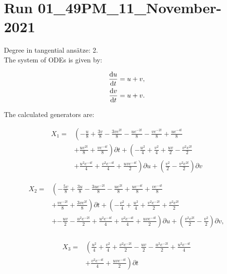 \section*{Run 01\_49PM\_11\_November-2021}
Degree in tangential ansätze:	2.\\
The system of ODEs is given by:

\begin{align*}
\dv{u}{t}&=u + v,\\
\dv{v}{t}&=u + v.\\
\end{align*}

\noindent The calculated generators are:

\begin{align*}
X_{1}=&\left(- \frac{u}{8}+\frac{3 v}{8}- \frac{3 v e^{2 t}}{8}- \frac{u e^{- 2 t}}{8}- \frac{v e^{- 2 t}}{8}+\frac{u e^{- 4 t}}{8}\right.\\
&+\left.\frac{u e^{2 t}}{8}+\frac{v e^{- 4 t}}{8} \right)\partial t+\left(- \frac{u^{2}}{4}+\frac{v^{2}}{4}+\frac{u v}{2}- \frac{v^{2} e^{2 t}}{2}\right.\\
&+\left.\frac{u^{2} e^{- 4 t}}{4}+\frac{v^{2} e^{- 4 t}}{4}+\frac{u v e^{- 4 t}}{2} \right)\partial u+\left(\frac{v^{2}}{2}- \frac{v^{2} e^{2 t}}{2} \right)\partial v
\end{align*}

\begin{align*}
X_{2}=&\left(- \frac{5 v}{8}+\frac{3 u}{8}- \frac{3 u e^{- 2 t}}{8}- \frac{u e^{2 t}}{8}+\frac{u e^{- 4 t}}{8}+\frac{v e^{- 4 t}}{8}\right.\\
&+\left.\frac{v e^{- 2 t}}{8}+\frac{3 v e^{2 t}}{8} \right)\partial t+\left(- \frac{v^{2}}{4}+\frac{u^{2}}{4}+\frac{v^{2} e^{- 2 t}}{2}+\frac{v^{2} e^{2 t}}{2}\right.\\
&+\left.- \frac{u v}{2}- \frac{u^{2} e^{- 2 t}}{2}+\frac{u^{2} e^{- 4 t}}{4}+\frac{v^{2} e^{- 4 t}}{4}+\frac{u v e^{- 4 t}}{2} \right)\partial u+\left(\frac{v^{2} e^{2 t}}{2} - \frac{v^{2}}{2} \right)\partial v,\\
\end{align*}

\begin{align*}
X_{3}=&\left(\frac{u^{2}}{4}+\frac{v^{2}}{4}+\frac{v^{2} e^{- 2 t}}{2}- \frac{u v}{2}- \frac{u^{2} e^{- 2 t}}{2}+\frac{u^{2} e^{- 4 t}}{4}\right.\\
&+\left.\frac{v^{2} e^{- 4 t}}{4}+\frac{u v e^{- 4 t}}{2} \right)\partial t
\end{align*}

